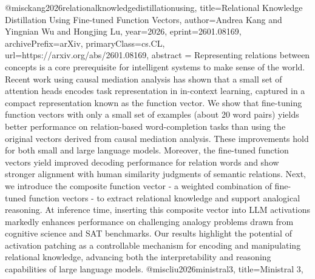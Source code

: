 {}@misc{kang2026relationalknowledgedistillationusing,
      title={Relational Knowledge Distillation Using Fine-tuned Function Vectors}, 
      author={Andrea Kang and Yingnian Wu and Hongjing Lu},
      year={2026},
      eprint={2601.08169},
      archivePrefix={arXiv},
      primaryClass={cs.CL},
      url={https://arxiv.org/abs/2601.08169},
      abstract = {Representing relations between concepts is a core prerequisite for intelligent systems to make sense of the world. Recent work using causal mediation analysis has shown that a small set of attention heads encodes task representation in in-context learning, captured in a compact representation known as the function vector. We show that fine-tuning function vectors with only a small set of examples (about 20 word pairs) yields better performance on relation-based word-completion tasks than using the original vectors derived from causal mediation analysis. These improvements hold for both small and large language models. Moreover, the fine-tuned function vectors yield improved decoding performance for relation words and show stronger alignment with human similarity judgments of semantic relations. Next, we introduce the composite function vector - a weighted combination of fine-tuned function vectors - to extract relational knowledge and support analogical reasoning. At inference time, inserting this composite vector into LLM activations markedly enhances performance on challenging analogy problems drawn from cognitive science and SAT benchmarks. Our results highlight the potential of activation patching as a controllable mechanism for encoding and manipulating relational knowledge, advancing both the interpretability and reasoning capabilities of large language models.}
}@misc{liu2026ministral3,
      title={Ministral 3}, 
}
